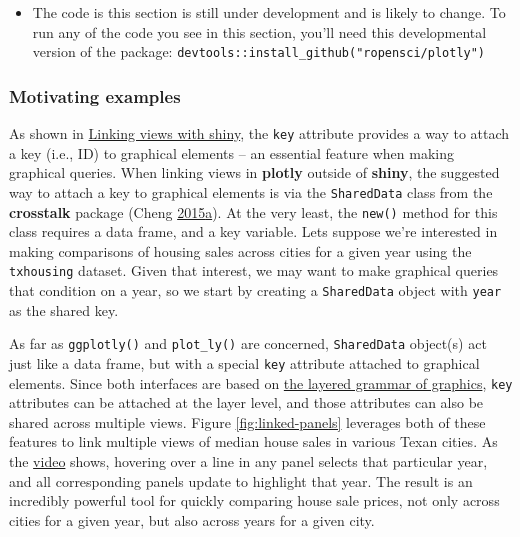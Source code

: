 \documentclass[12pt,]{isuthesis}
\newenvironment{Shaded}{\begin{snugshade}}{\end{snugshade}}
\newcommand{\KeywordTok}[1]{\textcolor[rgb]{0.13,0.29,0.53}{\textbf{{#1}}}}
\newcommand{\StringTok}[1]{\textcolor[rgb]{0.31,0.60,0.02}{{#1}}}
\newcommand{\CommentTok}[1]{\textcolor[rgb]{0.56,0.35,0.01}{\textit{{#1}}}}
\newcommand{\NormalTok}[1]{{#1}}
\newenvironment{rmdblock}[1]
  {\begin{shaded*}
  \begin{itemize}
  \renewcommand{\labelitemi}{
    \raisebox{-.7\height}[0pt][0pt]{
      {\setkeys{Gin}{width=3em,keepaspectratio}\texttt{[image: images/\#1]}}
    }
  }
  \item
  }
  {
  \end{itemize}
  \end{shaded*}
  }
\newenvironment{rmdwarning}
  {\begin{rmdblock}{warning}}
  {\end{rmdblock}}
\begin{document}
\begin{rmdwarning}
The code is this section is still under development and is likely to
change. To run any of the code you see in this section, you'll need this
developmental version of the package:
\texttt{devtools::install\_github("ropensci/plotly")}
\end{rmdwarning}

\subsubsection{Motivating examples}\label{motivating-examples}

As shown in \protect\hyperlink{linking-views-with-shiny}{Linking views
with shiny}, the \texttt{key} attribute provides a way to attach a key
(i.e., ID) to graphical elements -- an essential feature when making
graphical queries. When linking views in \textbf{plotly} outside of
\textbf{shiny}, the suggested way to attach a key to graphical elements
is via the \texttt{SharedData} class from the \textbf{crosstalk} package
(Cheng
\protect\hyperlink{ref-crosstalk}{2015}\protect\hyperlink{ref-crosstalk}{a}).
At the very least, the \texttt{new()} method for this class requires a
data frame, and a key variable. Lets suppose we're interested in making
comparisons of housing sales across cities for a given year using the
\texttt{txhousing} dataset. Given that interest, we may want to make
graphical queries that condition on a year, so we start by creating a
\texttt{SharedData} object with \texttt{year} as the shared key.

\begin{Shaded}
\end{Shaded}

As far as \texttt{ggplotly()} and \texttt{plot\_ly()} are concerned,
\texttt{SharedData} object(s) act just like a data frame, but with a
special \texttt{key} attribute attached to graphical elements. Since
both interfaces are based on
\protect\hyperlink{the-layered-grammar-of-graphics}{the layered grammar
of graphics}, \texttt{key} attributes can be attached at the layer
level, and those attributes can also be shared across multiple views.
Figure \ref{fig:linked-panels} leverages both of these features to link
multiple views of median house sales in various Texan cities. As the
\href{http://i.imgur.com/DdPdSBB.gif}{video} shows, hovering over a line
in any panel selects that particular year, and all corresponding panels
update to highlight that year. The result is an incredibly powerful tool
for quickly comparing house sale prices, not only across cities for a
given year, but also across years for a given city.
\end{document}
